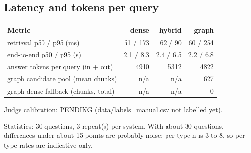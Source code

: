\subsection*{Latency and tokens per query}

\begin{center}
\begin{tabular}{lrrr}
\toprule
Metric & dense & hybrid & graph \\
\midrule
retrieval p50 / p95 (ms) & 51 / 173 & 62 / 90 & 60 / 254 \\
end-to-end p50 / p95 (s) & 2.1 / 8.3 & 2.4 / 6.5 & 2.2 / 6.8 \\
answer tokens per query (in + out) & 4910 & 5312 & 4822 \\
graph candidate pool (mean chunks) & n/a & n/a & 627 \\
graph dense fallback (chunks, total) & n/a & n/a & 0 \\
\bottomrule
\end{tabular}
\end{center}

Judge calibration: PENDING (data/labels\_manual.csv not labelled yet).

Statistics: 30 questions, 3 repeat(s) per system. With about 30 questions, differences under about 15 points are probably noise; per-type n is 3 to 8, so per-type rates are indicative only.
